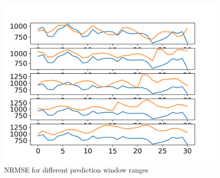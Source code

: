  \begin{figure}[h]
    \centering
    \includegraphics[width=\textwidth]{./results/images/realvspredicted}

     \caption{NRMSE for different prediction window ranges}\label{fig:realvspredicted}
 \end{figure}
 